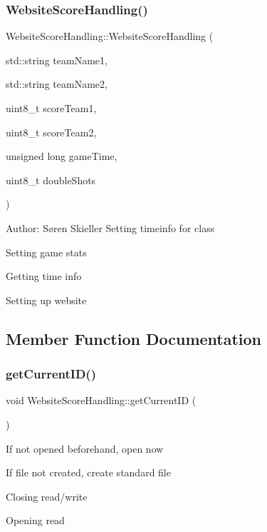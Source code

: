 \subsubsection{\texorpdfstring{Website\+Score\+Handling()}{WebsiteScoreHandling()}}
{\footnotesize\ttfamily Website\+Score\+Handling\+::\+Website\+Score\+Handling (\begin{DoxyParamCaption}\item[{std\+::string}]{team\+Name1,  }\item[{std\+::string}]{team\+Name2,  }\item[{uint8\+\_\+t}]{score\+Team1,  }\item[{uint8\+\_\+t}]{score\+Team2,  }\item[{unsigned long}]{game\+Time,  }\item[{uint8\+\_\+t}]{double\+Shots }\end{DoxyParamCaption})}

Author\+: Søren Skieller Setting timeinfo for class

Setting game stats

Getting time info

Setting up website 

\subsection{Member Function Documentation}
\mbox{\label{class_website_score_handling_a973228f0341e39ce97c013707260b08c}} 
\subsubsection{\texorpdfstring{get\+Current\+I\+D()}{getCurrentID()}}
{\footnotesize\ttfamily void Website\+Score\+Handling\+::get\+Current\+ID (\begin{DoxyParamCaption}{ }\end{DoxyParamCaption})\hspace{0.3cm}{\ttfamily [private]}}

If not opened beforehand, open now

If file not created, create standard file

Closing read/write

Opening read

